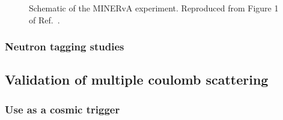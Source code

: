 \begin{figure}[htb]
  \centering
  \caption{Schematic of the MINERvA experiment. Reproduced from Figure 1 of Ref.~\cite{minerva-nim}.}
  \label{fig:pi0_containment}
\end{figure}

\subsubsection{Neutron tagging studies}

\subsection{Validation of multiple coulomb scattering}

\subsubsection{Use as a cosmic trigger}

